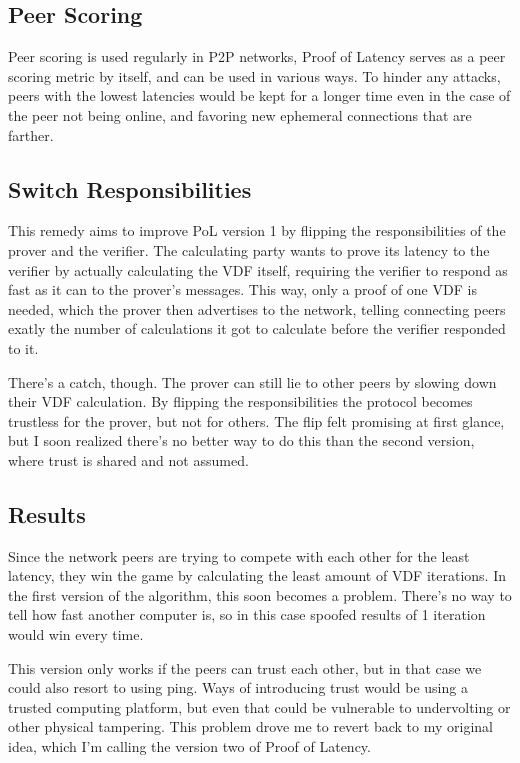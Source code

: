 \subsection{Peer Scoring}
Peer scoring is used regularly in P2P networks, 
Proof of Latency serves as a peer scoring metric by itself, and can be used in various ways. To hinder any attacks, peers with the lowest latencies would be kept for a longer time even in the case of the peer not being online, and favoring new ephemeral connections that are farther. 

\subsection{Switch Responsibilities}
This remedy aims to improve PoL version 1 by flipping the responsibilities of the prover and the verifier. The calculating party wants to prove its latency to the verifier by actually calculating the VDF itself, requiring the verifier to respond as fast as it can to the prover's messages. This way, only a proof of one VDF is needed, which the prover then advertises to the network, telling connecting peers exatly the number of calculations it got to calculate before the verifier responded to it. 

There's a catch, though. The prover can still lie to other peers by slowing down their VDF calculation. By flipping the responsibilities the protocol becomes trustless for the prover, but not for others. The flip felt promising at first glance, but I soon realized there's no better way to do this than the second version, where trust is shared and not assumed.

\subsection{Results}
Since the network peers are trying to compete with each other for the least latency, they win the game by calculating the least amount of VDF iterations. In the first version of the algorithm, this soon becomes a problem. There's no way to tell how fast another computer is, so in this case spoofed results of 1 iteration would win every time.

This version only works if the peers can trust each other, but in that case we could also resort to using ping. Ways of introducing trust would be using a trusted computing platform, but even that could be vulnerable to undervolting or other physical tampering. This problem drove me to revert back to my original idea, which I'm calling the version two of Proof of Latency.

